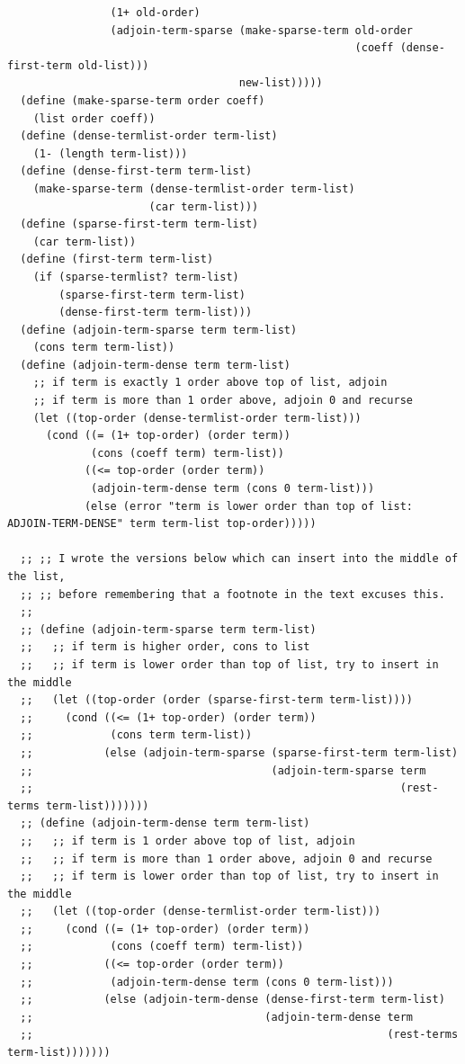 \documentclass[final,fleqn,titlepage,twoside]{article}
\begin{document}
\begin{verbatim}
                (1+ old-order)
                (adjoin-term-sparse (make-sparse-term old-order
                                                      (coeff (dense-first-term old-list)))
                                    new-list)))))
  (define (make-sparse-term order coeff)
    (list order coeff))
  (define (dense-termlist-order term-list)
    (1- (length term-list)))
  (define (dense-first-term term-list)
    (make-sparse-term (dense-termlist-order term-list)
                      (car term-list)))
  (define (sparse-first-term term-list)
    (car term-list))
  (define (first-term term-list)
    (if (sparse-termlist? term-list)
        (sparse-first-term term-list)
        (dense-first-term term-list)))
  (define (adjoin-term-sparse term term-list)
    (cons term term-list))
  (define (adjoin-term-dense term term-list)
    ;; if term is exactly 1 order above top of list, adjoin
    ;; if term is more than 1 order above, adjoin 0 and recurse
    (let ((top-order (dense-termlist-order term-list)))
      (cond ((= (1+ top-order) (order term))
             (cons (coeff term) term-list))
            ((<= top-order (order term))
             (adjoin-term-dense term (cons 0 term-list)))
            (else (error "term is lower order than top of list: ADJOIN-TERM-DENSE" term term-list top-order)))))

  ;; ;; I wrote the versions below which can insert into the middle of the list,
  ;; ;; before remembering that a footnote in the text excuses this.
  ;;
  ;; (define (adjoin-term-sparse term term-list)
  ;;   ;; if term is higher order, cons to list
  ;;   ;; if term is lower order than top of list, try to insert in the middle
  ;;   (let ((top-order (order (sparse-first-term term-list))))
  ;;     (cond ((<= (1+ top-order) (order term))
  ;;            (cons term term-list))
  ;;           (else (adjoin-term-sparse (sparse-first-term term-list)
  ;;                                     (adjoin-term-sparse term
  ;;                                                         (rest-terms term-list)))))))
  ;; (define (adjoin-term-dense term term-list)
  ;;   ;; if term is 1 order above top of list, adjoin
  ;;   ;; if term is more than 1 order above, adjoin 0 and recurse
  ;;   ;; if term is lower order than top of list, try to insert in the middle
  ;;   (let ((top-order (dense-termlist-order term-list)))
  ;;     (cond ((= (1+ top-order) (order term))
  ;;            (cons (coeff term) term-list))
  ;;           ((<= top-order (order term))
  ;;            (adjoin-term-dense term (cons 0 term-list)))
  ;;           (else (adjoin-term-dense (dense-first-term term-list)
  ;;                                    (adjoin-term-dense term
  ;;                                                       (rest-terms term-list)))))))


\end{verbatim}
\end{document}
